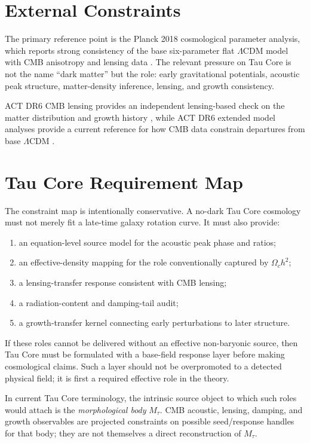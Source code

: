 \documentclass[11pt]{article}
\begin{document}
\section{External Constraints}

The primary reference point is the Planck 2018 cosmological parameter analysis,
which reports strong consistency of the base six-parameter flat
$\Lambda$CDM model with CMB anisotropy and lensing data
\cite{planck2018parameters}. The relevant pressure on Tau Core is not the name
``dark matter'' but the role: early gravitational potentials, acoustic peak
structure, matter-density inference, lensing, and growth consistency.

ACT DR6 CMB lensing provides an independent lensing-based check on the matter
distribution and growth history \cite{actdr6lensing}, while ACT DR6 extended
model analyses provide a current reference for how CMB data constrain departures
from base $\Lambda$CDM \cite{actdr6extended}.

\section{Tau Core Requirement Map}

The constraint map is intentionally conservative. A no-dark Tau Core cosmology
must not merely fit a late-time galaxy rotation curve. It must also provide:

\begin{enumerate}
\item an equation-level source model for the acoustic peak phase and ratios;
\item an effective-density mapping for the role conventionally captured by
  $\Omega_c h^2$;
\item a lensing-transfer response consistent with CMB lensing;
\item a radiation-content and damping-tail audit;
\item a growth-transfer kernel connecting early perturbations to later
  structure.
\end{enumerate}

If these roles cannot be delivered without an effective non-baryonic source,
then Tau Core must be formulated with a base-field response layer before making
cosmological claims. Such a layer should not be overpromoted to a detected
physical field; it is first a required effective role in the theory.

In current Tau Core terminology, the intrinsic source object to which such
roles would attach is the \emph{morphological body} \(M_\tau\).  CMB acoustic,
lensing, damping, and growth observables are projected constraints on possible
seed/response handles for that body; they are not themselves a direct
reconstruction of \(M_\tau\).
\end{document}
